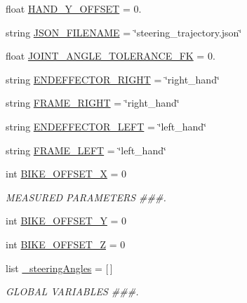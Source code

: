 \begin{DoxyCompactItemize}
\item 
float \mbox{\hyperlink{namespacesteering__capture__trajectory_a4b004afa964a66c0d3cdcc2b81f67386}{H\+A\+N\+D\+\_\+\+Y\+\_\+\+O\+F\+F\+S\+ET}} = 0.
\item 
string \mbox{\hyperlink{namespacesteering__capture__trajectory_a7e2b1050b2fe47fb4ae1704b59e3afb0}{J\+S\+O\+N\+\_\+\+F\+I\+L\+E\+N\+A\+ME}} = \char`\"{}steering\+\_\+trajectory.\+json\char`\"{}
\item 
float \mbox{\hyperlink{namespacesteering__capture__trajectory_a9787d7899193f806654022c547ee505d}{J\+O\+I\+N\+T\+\_\+\+A\+N\+G\+L\+E\+\_\+\+T\+O\+L\+E\+R\+A\+N\+C\+E\+\_\+\+FK}} = 0.
\item 
string \mbox{\hyperlink{namespacesteering__capture__trajectory_a7c1f71bc6b898248ac16df57fd8b89c4}{E\+N\+D\+E\+F\+F\+E\+C\+T\+O\+R\+\_\+\+R\+I\+G\+HT}} = \char`\"{}right\+\_\+hand\char`\"{}
\item 
string \mbox{\hyperlink{namespacesteering__capture__trajectory_a163ffb32c2e3d5912e399042ab3908bf}{F\+R\+A\+M\+E\+\_\+\+R\+I\+G\+HT}} = \char`\"{}right\+\_\+hand\char`\"{}
\item 
string \mbox{\hyperlink{namespacesteering__capture__trajectory_a66c4ad81ad6416fb7c79ab1d5c2e5cf1}{E\+N\+D\+E\+F\+F\+E\+C\+T\+O\+R\+\_\+\+L\+E\+FT}} = \char`\"{}left\+\_\+hand\char`\"{}
\item 
string \mbox{\hyperlink{namespacesteering__capture__trajectory_a0d3673795190cc7c33f4ba3f03aa9f80}{F\+R\+A\+M\+E\+\_\+\+L\+E\+FT}} = \char`\"{}left\+\_\+hand\char`\"{}
\item 
int \mbox{\hyperlink{namespacesteering__capture__trajectory_a14a3057579ca761490f56ee0268e77f5}{B\+I\+K\+E\+\_\+\+O\+F\+F\+S\+E\+T\+\_\+X}} = 0
\begin{DoxyCompactList}\small\item\em M\+E\+A\+S\+U\+R\+ED P\+A\+R\+A\+M\+E\+T\+E\+RS \#\#\#. \end{DoxyCompactList}\item 
int \mbox{\hyperlink{namespacesteering__capture__trajectory_acbe3b460b2e8e6a24c3e44831b7ed338}{B\+I\+K\+E\+\_\+\+O\+F\+F\+S\+E\+T\+\_\+Y}} = 0
\item 
int \mbox{\hyperlink{namespacesteering__capture__trajectory_a70e93c77cf6cac9e0d3bab91a69be07f}{B\+I\+K\+E\+\_\+\+O\+F\+F\+S\+E\+T\+\_\+Z}} = 0
\item 
list \mbox{\hyperlink{namespacesteering__capture__trajectory_ab7d2249959dedbedbf988a93ba089aff}{\+\_\+steering\+Angles}} = \mbox{[}$\,$\mbox{]}
\begin{DoxyCompactList}\small\item\em G\+L\+O\+B\+AL V\+A\+R\+I\+A\+B\+L\+ES \#\#\#. \end{DoxyCompactList}\item 

\end{DoxyCompactItemize}
